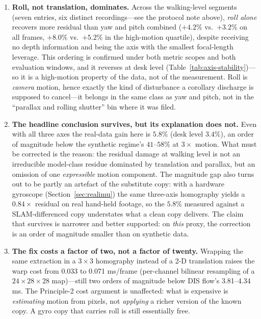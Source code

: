 \documentclass[12pt,a4paper]{article}
\begin{document}
\begin{enumerate}
  \item \textbf{Roll, not translation, dominates.} Across the walking-level segments (seven entries, six distinct recordings---see the protocol note above), \emph{roll alone} recovers more residual than yaw and pitch combined ($+4.2\%$ vs.\ $+3.2\%$ on all frames, $+8.0\%$ vs.\ $+5.2\%$ in the high-motion quartile), despite receiving no depth information and being the axis with the smallest focal-length leverage. This ordering is confirmed under both metric scopes and both evaluation windows, and it reverses at desk level (Table~\ref{tab:axis-stability})---so it is a high-motion property of the data, not of the measurement. Roll is \emph{camera} motion, hence exactly the kind of disturbance a corollary discharge is supposed to cancel---it belongs in the same class as yaw and pitch, not in the ``parallax and rolling shutter'' bin where it was filed.
  \item \textbf{The headline conclusion survives, but its explanation does not.} Even with all three axes the real-data gain here is $5.8\%$ (desk level $3.4\%$), an order of magnitude below the synthetic regime's $41$--$58\%$ at $3\times$ motion. What must be corrected is the reason: the residual damage at walking level is not an irreducible model-class residue dominated by translation and parallax, but an omission of one \emph{expressible} motion component. The magnitude gap also turns out to be partly an artefact of the substitute copy: with a hardware gyroscope (Section~\ref{sec:realimu}) the same three-axis homography yields a $0.84\times$ residual on real hand-held footage, so the $5.8\%$ measured against a SLAM-differenced copy understates what a clean copy delivers. The claim that survives is narrower and better supported: on \emph{this} proxy, the correction is an order of magnitude smaller than on synthetic data.
  \item \textbf{The fix costs a factor of two, not a factor of twenty.} Wrapping the same extraction in a $3\times3$ homography instead of a 2-D translation raises the warp cost from 0.033 to 0.071 ms/frame (per-channel bilinear resampling of a $24{\times}28{\times}28$ map)---still two orders of magnitude below DIS flow's 3.81--4.34 ms. The Principle-2 cost argument is unaffected: what is expensive is \emph{estimating} motion from pixels, not \emph{applying} a richer version of the known copy. A gyro copy that carries roll is still essentially free.
\end{enumerate}
\end{document}
